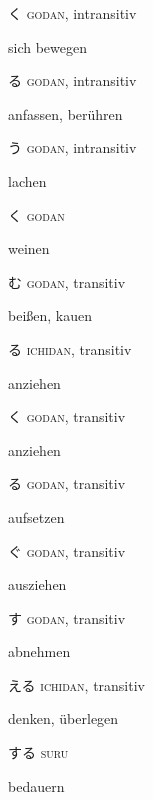\vocab
  {く}
  {\textsc{godan}, intransitiv}
  {\item sich bewegen}

\vocab
  {る}
  {\textsc{godan}, intransitiv}
  {\item anfassen, berühren}

\vocab
  {う}
  {\textsc{godan}, intransitiv}
  {\item lachen}

\vocab
  {く}
  {\textsc{godan}}
  {\item weinen}

\vocab
  {む}
  {\textsc{godan}, transitiv}
  {\item beißen, kauen}

\vocab
  {る}
  {\textsc{ichidan}, transitiv}
  {\item anziehen }

\vocab
  {く}
  {\textsc{godan}, transitiv}
  {\item anziehen }

\vocab
  {る}
  {\textsc{godan}, transitiv}
  {\item aufsetzen }

\vocab
  {ぐ}
  {\textsc{godan}, transitiv}
  {\item ausziehen }

\vocab
    {す}
    {\textsc{godan}, transitiv}
    {\item abnehmen }

\vocab
  {える}
  {\textsc{ichidan}, transitiv}
  {\item denken, überlegen}

\vocab
  {する}
  {\textsc{suru}}
  {\item bedauern}


